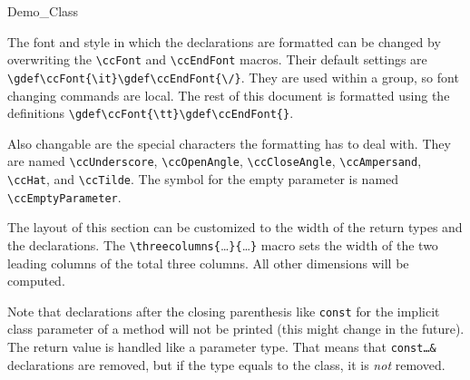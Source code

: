 \documentclass[12pt]{article}
\begin{document}
\begin{ccClass}{Demo_Class}
{




The font and style in which the declarations are formatted can be
changed by overwriting the \verb"\ccFont" and \verb"\ccEndFont"
macros. Their default settings are
\verb"\gdef\ccFont{\it}\gdef\ccEndFont{\/}". They are used within a
group, so font changing commands are local. The rest of this document is
formatted using the definitions \verb"\gdef\ccFont{\tt}\gdef\ccEndFont{}".

\gdef\ccFont{\tt}\gdef\ccEndFont{}

\gdef\ccFont{\it}\gdef\ccEndFont{\/}

Also changable are the special characters the formatting has to
deal with. They are named \verb"\ccUnderscore", \verb"\ccOpenAngle",
\verb"\ccCloseAngle", \verb"\ccAmpersand", \verb"\ccHat", and
\verb"\ccTilde". The symbol for the empty parameter is named
\verb"\ccEmptyParameter".

  \ccOperations
  \ccSetTwoOfThreeColumns{2.8cm}{2.8cm}

The layout of this section can be customized to the width of the
return types and the declarations. The
\verb"\"\verb"threecolumns{"\ldots\verb"}{"\ldots\verb"}" macro sets the
width of the two leading columns of the total three columns. All other
dimensions will be computed.

Note that declarations after the closing parenthesis like {\tt const}
for the implicit class parameter of a method will not be printed
(this might change in the future).
The return value is handled like a parameter type. That means that
{\tt const\ldots\&} declarations are removed, but if the type equals
to the class, it is {\em not} removed.



}
\end{ccClass}
\end{document}
